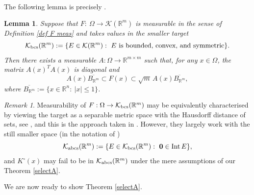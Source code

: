 \documentclass[11pt, reqno]{amsart}
\newtheorem{lemma}[theorem]{Lemma}
\theoremstyle{definition}
\theoremstyle{remark}
\newtheorem{remark}[theorem]{Remark}
\numberwithin{equation}{section}
\newcommand{\R}{\mathbb R}
\begin{document}
The following lemma is precisely \cite[Theorem 3.7]{BCU}.

\begin{lemma}\label{BCU37}
Suppose that $F:\ \Omega\to\mathcal K(\R^m)$ is measurable
in the sense of Definition \ref{def F meas}
and takes values in the smaller target
\begin{equation*}
\mathcal K_{\rm{bcs}}(\R^m)
:=\{E\in\mathcal K(\R^m):\
E \text{ is bounded, convex, and symmetric}\}.
\end{equation*}
Then there exists a measurable $A:\Omega\to\R^{m\times m}$ such that,
for any $x\in\Omega$, the matrix $A(x)^TA(x)$ is diagonal and
\begin{equation*}
A(x)\overline{B_{\R^m}}\subset F(x)\subset \sqrt{m}\,A(x)\overline{B_{\R^m}},
\end{equation*}
where $\overline{B_{\R^m}}:= \{x\in\mathbb R^n:\ |x|\le 1\}$.
\end{lemma}

\begin{remark}
Measurability of $F:\Omega\to\mathcal K_{\rm{bcs}}(\R^m)$ may be equivalently characterised by viewing the target as a separable metric space with the Hausdorff distance of sets, see \cite[Theorem 3.5]{BCU}, and this is the approach taken in \cite[Appendix A.4]{DKPS}. However, they largely work with the still smaller space (in the notation of \cite{BCU})
\begin{equation*}
\mathcal K_{\rm{abcs}}(\R^m)
:=\{E\in\mathcal K_{\rm{bcs}}(\R^m):\ \mathbf 0\in\operatorname{Int}E\},
\end{equation*}
and $K^\circ(x)$ may fail to be in $\mathcal K_{\rm{abcs}}(\R^m)$ under the mere assumptions of our Theorem \ref{selectA}.
\end{remark}

We are now ready to show Theorem \ref{selectA}.
\end{document}
